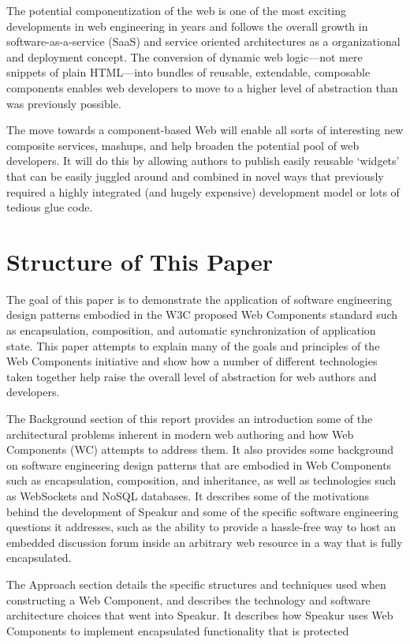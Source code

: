 The potential componentization of the web is one of the most exciting developments in web engineering in years and follows the overall growth in software-as-a-service (SaaS) 
and service oriented architectures 
as a organizational and deployment concept. 
The conversion of dynamic web logic---not mere snippets of plain HTML---into bundles of reusable, extendable, composable components enables web developers to move to a higher level of abstraction than was previously possible.

The move towards a component-based Web will enable all sorts of interesting new composite services, mashups, and help broaden the potential pool of web developers. 
It will do this by allowing authors to publish easily reusable `widgets' that can be easily juggled around and combined in novel ways that previously required a highly integrated (and hugely expensive) development model or lots of tedious glue code.


\section{Structure of This Paper}
%

The goal of this paper is to demonstrate the application of software engineering design patterns embodied in the  W3C proposed Web Components standard such as encapsulation, composition, and
automatic synchronization of application state. 
This paper attempts to explain many of the goals and principles of the Web Components initiative and show how a number of different technologies taken together help raise the overall level of abstraction for web authors and developers.

The Background section of this report provides an introduction some of the architectural problems inherent in modern web authoring and how Web Components (WC) attempts to address them. 
It also provides some background on software engineering design patterns that are embodied in Web Components such as encapsulation, composition, and inheritance, as well as technologies such as WebSockets and NoSQL databases.
It describes some of the motivations behind the development of Speakur and some of the specific software engineering questions it addresses, such as the ability to provide a hassle-free way to host an embedded discussion forum inside an arbitrary web resource in a way that is fully encapsulated.

The Approach section details the specific structures and techniques used when constructing a Web Component, and describes the technology and software architecture choices that went into Speakur. 
It describes how Speakur uses Web Components to implement encapsulated functionality that is protected 

